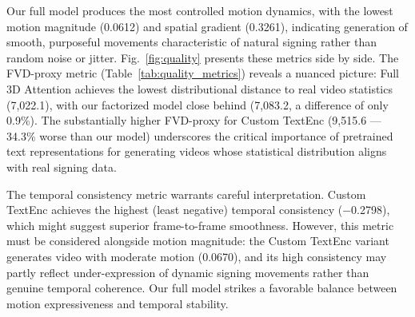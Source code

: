 \documentclass{ieeeaccess}
\begin{document}
{\color{blue}%
\begin{table}[H]
    \centering
    \caption{Generation Quality Metrics Across Ablation Variants. \textbf{Bold} = best; \underline{underline} = second best.}
    \label{tab:quality_metrics}
    \renewcommand{\arraystretch}{1.15}
\end{table}
}

{\color{blue}%
Our full model produces the most controlled motion dynamics, with the lowest motion magnitude (0.0612) and spatial gradient (0.3261), indicating generation of smooth, purposeful movements characteristic of natural signing rather than random noise or jitter. Fig.~\ref{fig:quality} presents these metrics side by side. The FVD-proxy metric (Table~\ref{tab:quality_metrics}) reveals a nuanced picture: Full 3D Attention achieves the lowest distributional distance to real video statistics (7{,}022.1), with our factorized model close behind (7{,}083.2, a difference of only 0.9\%). The substantially higher FVD-proxy for Custom TextEnc (9{,}515.6 — 34.3\% worse than our model) underscores the critical importance of pretrained text representations for generating videos whose statistical distribution aligns with real signing data.

The temporal consistency metric warrants careful interpretation. Custom TextEnc achieves the highest (least negative) temporal consistency ($-$0.2798), which might suggest superior frame-to-frame smoothness. However, this metric must be considered alongside motion magnitude: the Custom TextEnc variant generates video with moderate motion (0.0670), and its high consistency may partly reflect under-expression of dynamic signing movements rather than genuine temporal coherence. Our full model strikes a favorable balance between motion expressiveness and temporal stability.
}
\end{document}
